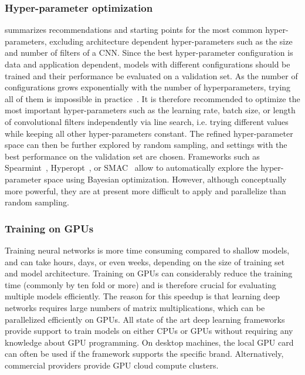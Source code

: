 \subsubsection{Hyper-parameter optimization} \label{sec:dl_hyper}
 summarizes recommendations and starting points for the most common hyper-parameters, excluding architecture dependent hyper-parameters such as the size and number of filters of a CNN. Since the best hyper-parameter configuration is data and application dependent, models with different configurations should be trained and their performance be evaluated on a validation set. As the number of configurations grows exponentially with the number of hyperparameters, trying all of them is impossible in practice~\citep{bengio_practical_2012}. It is therefore recommended to optimize the most important hyper-parameters such as the learning rate, batch size, or length of convolutional filters independently via line search, i.e. trying different values while keeping all other hyper-parameters constant. The refined hyper-parameter space can then be further explored by random sampling, and settings with the best performance on the validation set are chosen. Frameworks such as Spearmint~\citep{snoek_practical_2012}, Hyperopt~\citep{bergstra_hyperparameter_2013}, or SMAC~\citep{hutter_sequential_2011} allow to automatically explore the hyper-parameter space using Bayesian optimization. However, although conceptually more powerful, they are at present more difficult to apply and parallelize than random sampling.

\subsubsection{Training on GPUs}
Training neural networks is more time consuming compared to shallow models, and can take hours, days, or even weeks, depending on the size of training set and model architecture. Training on GPUs can considerably reduce the training time (commonly by ten fold or more) and is therefore crucial for evaluating multiple models efficiently. The reason for this speedup is that learning deep networks requires large numbers of matrix multiplications, which can be parallelized efficiently on GPUs. All state of the art deep learning frameworks provide support to train models on either CPUs or GPUs without requiring any knowledge about GPU programming. On desktop machines, the local GPU card can often be used if the framework supports the specific brand. Alternatively, commercial providers provide GPU cloud compute clusters.

